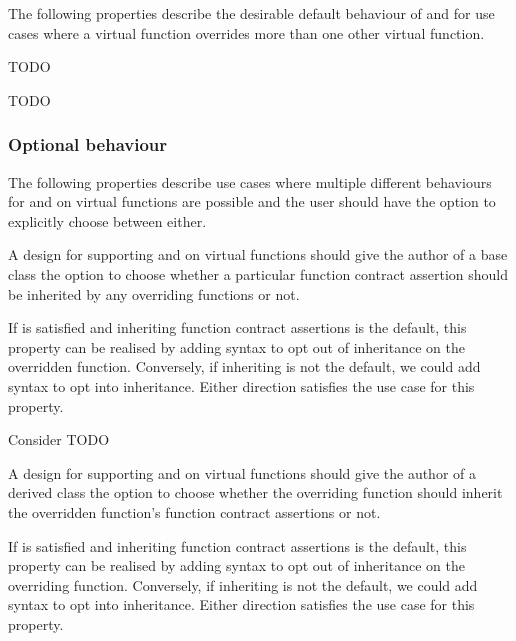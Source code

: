 The following properties describe the desirable default behaviour of  and  for use cases where a virtual function overrides  more than one other virtual function.


TODO


TODO


\subsubsection{Optional behaviour}

The following properties describe use cases where multiple different behaviours for  and  on virtual functions are possible and the user should have the option to explicitly choose between either.



 
A design for supporting  and  on virtual functions should give the author of a base class the option to choose whether a particular function contract assertion should be inherited by any overriding functions or not.

If  is satisfied and inheriting function contract assertions is the default, this property can be realised by adding syntax to opt out of inheritance on the overridden function. Conversely, if inheriting is not the default, we could add syntax to opt into inheritance. Either direction satisfies the use case for this property.

Consider TODO


A design for supporting  and  on virtual functions should give the author of a derived class the option to choose whether the overriding function should inherit the overridden function's function contract assertions or not.

If  is satisfied and inheriting function contract assertions is the default, this property can be realised by adding syntax to opt out of inheritance on the overriding function. Conversely, if inheriting is not the default, we could add syntax to opt into inheritance. Either direction satisfies the use case for this property.

